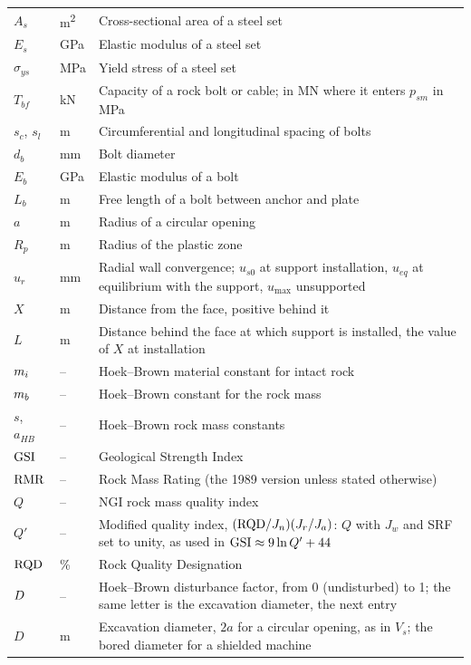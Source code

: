 \begin{longtable}{ll>{\raggedright\arraybackslash}p{}}
$A_s$ & \si{\metre\squared} & Cross-sectional area of a steel set \\
$E_s$ & \si{\giga\pascal} & Elastic modulus of a steel set \\
$\sigma_{ys}$ & \si{\mega\pascal} & Yield stress of a steel set \\
$T_{bf}$ & \si{\kilo\newton} & Capacity of a rock bolt or cable; in \si{\mega\newton} where it enters $p_{sm}$ in \si{\mega\pascal} \\
$s_c$, $s_l$ & \si{\metre} & Circumferential and longitudinal spacing of bolts \\
$d_b$ & \si{\milli\metre} & Bolt diameter \\
$E_b$ & \si{\giga\pascal} & Elastic modulus of a bolt \\
$L_b$ & \si{\metre} & Free length of a bolt between anchor and plate \\
$a$ & \si{\metre} & Radius of a circular opening \\
$R_p$ & \si{\metre} & Radius of the plastic zone \\
$u_r$ & \si{\milli\metre} & Radial wall convergence; $u_{s0}$ at support installation, $u_{eq}$ at equilibrium with the support, $u_{\max}$ unsupported \\
$X$ & \si{\metre} & Distance from the face, positive behind it \\
$L$ & \si{\metre} & Distance behind the face at which support is installed, the value of $X$ at installation \\
$m_i$ & -- & Hoek--Brown material constant for intact rock \\
$m_b$ & -- & Hoek--Brown constant for the rock mass \\
$s$, $a_{HB}$ & -- & Hoek--Brown rock mass constants \\
$\mathrm{GSI}$ & -- & Geological Strength Index \\
$\mathrm{RMR}$ & -- & Rock Mass Rating (the 1989 version unless stated otherwise) \\
$Q$ & -- & NGI rock mass quality index \\
$Q'$ & -- & Modified quality index, $(\mathrm{RQD}/J_n)(J_r/J_a)$: $Q$ with $J_w$ and SRF set to unity, as used in $\mathrm{GSI} \approx 9\ln Q' + 44$ \\
$\mathrm{RQD}$ & \si{\percent} & Rock Quality Designation \\
$D$ & -- & Hoek--Brown disturbance factor, from 0 (undisturbed) to 1; the same letter is the excavation diameter, the next entry \\
$D$ & \si{\metre} & Excavation diameter, $2a$ for a circular opening, as in $V_s$; the bored diameter for a shielded machine \\

\end{longtable}
